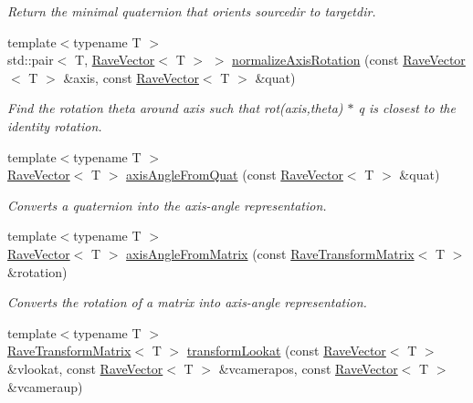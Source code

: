 \begin{DoxyCompactItemize}
\begin{DoxyCompactList}\small\item\em Return the minimal quaternion that orients sourcedir to targetdir. \item\end{DoxyCompactList}\item 
{\footnotesize template$<$typename T $>$ }\\std::pair$<$ T, \hyperlink{classOpenRAVE_1_1geometry_1_1RaveVector}{RaveVector}$<$ T $>$ $>$ \hyperlink{group__affine__math_ga436efaa950bb38f3b3b8a891e5da5591}{normalizeAxisRotation} (const \hyperlink{classOpenRAVE_1_1geometry_1_1RaveVector}{RaveVector}$<$ T $>$ \&axis, const \hyperlink{classOpenRAVE_1_1geometry_1_1RaveVector}{RaveVector}$<$ T $>$ \&quat)
\begin{DoxyCompactList}\small\item\em Find the rotation theta around axis such that rot(axis,theta) $\ast$ q is closest to the identity rotation. \item\end{DoxyCompactList}\item 
{\footnotesize template$<$typename T $>$ }\\\hyperlink{classOpenRAVE_1_1geometry_1_1RaveVector}{RaveVector}$<$ T $>$ \hyperlink{group__affine__math_ga95a2de86a8789000c0a12ce91bbefe0c}{axisAngleFromQuat} (const \hyperlink{classOpenRAVE_1_1geometry_1_1RaveVector}{RaveVector}$<$ T $>$ \&quat)
\begin{DoxyCompactList}\small\item\em Converts a quaternion into the axis-\/angle representation. \item\end{DoxyCompactList}\item 
{\footnotesize template$<$typename T $>$ }\\\hyperlink{classOpenRAVE_1_1geometry_1_1RaveVector}{RaveVector}$<$ T $>$ \hyperlink{group__affine__math_gabf46823a4c5b59c9ac3e72f0905bea24}{axisAngleFromMatrix} (const \hyperlink{classOpenRAVE_1_1geometry_1_1RaveTransformMatrix}{RaveTransformMatrix}$<$ T $>$ \&rotation)
\begin{DoxyCompactList}\small\item\em Converts the rotation of a matrix into axis-\/angle representation. \item\end{DoxyCompactList}\item 
{\footnotesize template$<$typename T $>$ }\\\hyperlink{classOpenRAVE_1_1geometry_1_1RaveTransformMatrix}{RaveTransformMatrix}$<$ T $>$ \hyperlink{group__affine__math_ga9db1071fa2f5264616dabb3b3d16eec9}{transformLookat} (const \hyperlink{classOpenRAVE_1_1geometry_1_1RaveVector}{RaveVector}$<$ T $>$ \&vlookat, const \hyperlink{classOpenRAVE_1_1geometry_1_1RaveVector}{RaveVector}$<$ T $>$ \&vcamerapos, const \hyperlink{classOpenRAVE_1_1geometry_1_1RaveVector}{RaveVector}$<$ T $>$ \&vcameraup)

\end{DoxyCompactItemize}
